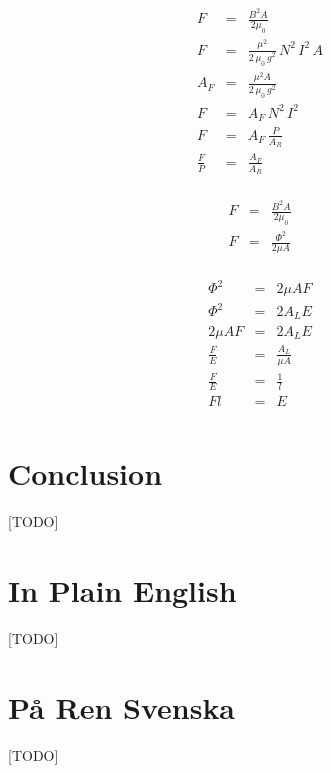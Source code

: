 \begin{eqnarray}
F &=& \frac{B^2 A}{2 \mu_0} \\
F &=& \frac{\mu^2}{2 \, \mu_0 \, g^2} \, N^2 \, I^2 \, A \\
A_F &=& \frac{\mu^2 A}{2 \, \mu_0 \, g^2} \\
F &=& A_F \, N^2 \, I^2 \\
F &=& A_F \, \frac{P}{A_R} \\
\frac{F}{P} &=& \frac{A_F}{A_R} \\
\end{eqnarray}

\begin{eqnarray}
F &=& \frac{B^2 A}{2 \mu_0} \\
F &=& \frac{{\Phi}^2}{2 \mu A} \\
\end{eqnarray}

\begin{eqnarray}
{\Phi}^2 &=& 2 \mu A F \\
{\Phi}^2 &=& 2 A_L E \\
2 \mu A F &=& 2 A_L E \\
\frac{F}{E} &=& \frac{A_L}{\mu A} \\
\frac{F}{E} &=& \frac{1}{l} \\
F l &=& E \\
\end{eqnarray}

\section{Conclusion}

[TODO]

\appendix

\section{In Plain English}

[TODO]

\section{På Ren Svenska}

[TODO]


